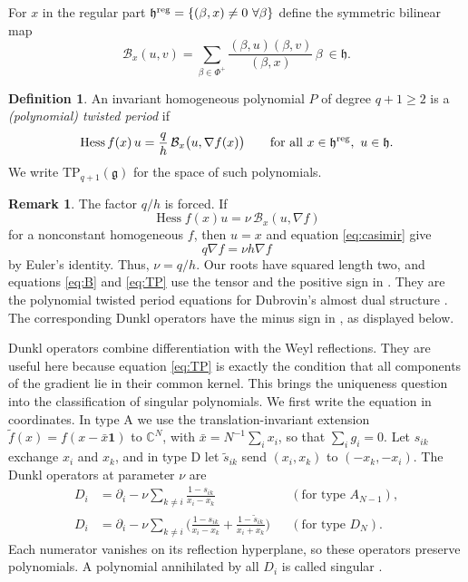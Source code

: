 \documentclass[10pt,reqno]{amsart}
\numberwithin{equation}{section}
\theoremstyle{plain}
\theoremstyle{definition}
\newtheorem{definition}[theorem]{Definition}
\newtheorem{remark}[theorem]{Remark}
\DeclareMathOperator{\Hess}{Hess}
\newcommand{\TP}{\mathrm{TP}}
\begin{document}
For $x$ in the regular part $\mathfrak{h}^{\rm reg}=\{(\beta,x)\neq0\ \forall\beta\}$ define the symmetric bilinear map
\begin{equation}\label{eq:B}
	\mathcal{B}_x(u,v)=\sum_{\beta\in\Phi^+}\frac{(\beta,u)(\beta,v)}{(\beta,x)}\,\beta\ \in\mathfrak{h} .
\end{equation}

\begin{definition}\label{def:TP}
An invariant homogeneous polynomial $P$ of degree $q+1\ge2$ is a \emph{(polynomial) twisted period} if
\begin{equation}\label{eq:TP}
	\Hess f(x)\,u=\frac qh\,\mathcal{B}_x\big(u,\nabla f(x)\big)\qquad\text{for all }x\in\mathfrak{h}^{\rm reg},\ u\in\mathfrak{h} .
\end{equation}
We write $\TP_{q+1}(\mathfrak{g})$ for the space of such polynomials.
\end{definition}

\begin{remark}\label{rem:parameter}
The factor $q/h$ is forced. If
\begin{equation*}
    \Hess f(x)u=\nu\,\mathcal{B}_x(u,\nabla f)
\end{equation*}
for a nonconstant homogeneous $f$, then $u=x$ and equation \eqref{eq:casimir} give
\begin{equation*}
    q\nabla f=\nu h\nabla f
\end{equation*}
by Euler's identity. Thus, $\nu=q/h$. Our roots have squared length two, and equations \eqref{eq:B} and \eqref{eq:TP} use the tensor and the positive sign in \cite[(2.1), (2.3)]{FS}. They are the polynomial twisted period equations for Dubrovin's almost dual structure \cite{DubrovinAlmost}. The corresponding Dunkl operators have the minus sign in \cite[(2.10)]{FS}, as displayed below.
\end{remark}

Dunkl operators combine differentiation with the Weyl reflections. They are useful here because equation \eqref{eq:TP} is exactly the condition that all components of the gradient lie in their common kernel. This brings the uniqueness question into the classification of singular polynomials. We first write the equation in coordinates. In type A we use the translation-invariant extension $\tilde f(x)=f(x-\bar x\mathbf 1)$ to $\mathbb{C}^N$, with $\bar x=N^{-1}\sum_ix_i$, so that $\sum_ig_i=0$. Let $s_{ik}$ exchange $x_i$ and $x_k$, and in type D let $\tilde s_{ik}$ send $(x_i,x_k)$ to $(-x_k,-x_i)$. The Dunkl operators \cite{Dunkl} at parameter $\nu$ are
\begin{align*}
	D_i&=\partial_i-\nu\sum_{k\neq i}\frac{1-s_{ik}}{x_i-x_k} &&(\text{for type }A_{N-1}),\\
	D_i&=\partial_i-\nu\sum_{k\neq i}\Big(\frac{1-s_{ik}}{x_i-x_k}+\frac{1-\tilde s_{ik}}{x_i+x_k}\Big) &&(\text{for type }D_N).
\end{align*}
Each numerator vanishes on its reflection hyperplane, so these operators preserve polynomials. A polynomial annihilated by all $D_i$ is called singular \cite{DJO}.
\end{document}
